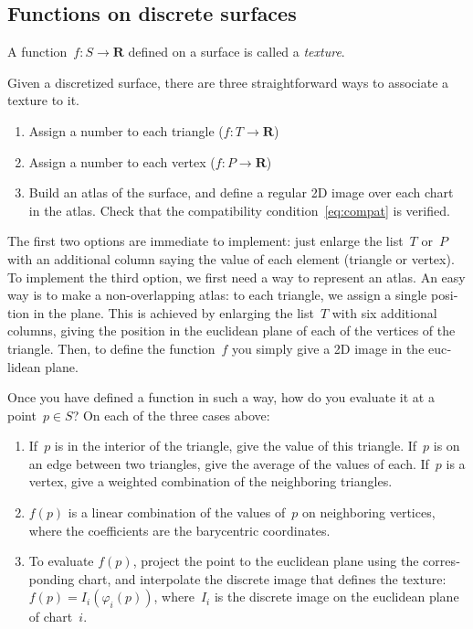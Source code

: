\documentclass{article}
\def\R{\mathbf{R}} %
\begin{document}
\begin{otherlanguage}{british}
\subsection{Functions on discrete surfaces}

A function~$f:S\to\R$ defined on a surface is called a \emph{texture}.

Given a discretized surface, there are three straightforward ways to
associate a texture to it.

\begin{enumerate}
	\item Assign a number to each triangle ($f:T\to\R$)
	\item Assign a number to each vertex ($f:P\to\R$)
	\item Build an atlas of the surface, and define a regular 2D image
		over each chart in the atlas.  Check that the compatibility
		condition~\ref{eq:compat} is verified.
\end{enumerate}

The first two options are immediate to implement: just enlarge the list~$T$
or~$P$ with an additional column saying the value of each element (triangle
or vertex).  To implement the third option, we first need a way to represent
an atlas.  An easy way is to make a non-overlapping atlas: to each triangle,
we assign a single position in the plane.  This is achieved by enlarging the
list~$T$ with six additional columns, giving the position in the euclidean
plane of each of the vertices of the triangle.  Then, to define the
function~$f$ you simply give a 2D image in the euclidean plane.

Once you have defined a function in such a way, how do you evaluate it at a
point~$p\in S$?  On each of the three cases above:
\begin{enumerate}
	\item If~$p$ is in the interior of the triangle, give the value of
		this triangle.  If~$p$ is on an edge between two triangles,
		give the average of the values of each.  If~$p$ is a vertex,
		give a weighted combination of the neighboring triangles.
	\item $f(p)$ is a linear combination of the values of~$p$ on
		neighboring vertices, where the coefficients are the
		barycentric coordinates.
	\item To evaluate $f(p)$, project the point to the euclidean plane
		using the corresponding chart, and interpolate the discrete
		image that defines the texture: $f(p)=I_i(\varphi_i(p))$,
		where~$I_i$ is the discrete image on the euclidean plane of
		chart~$i$.
\end{enumerate}


\end{otherlanguage}
\end{document}
